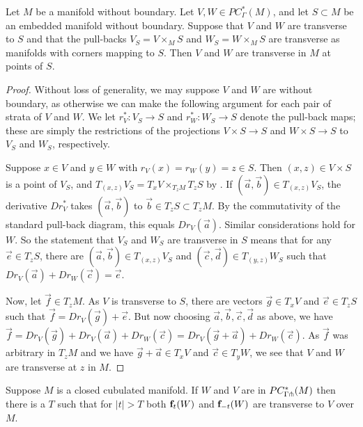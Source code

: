\begin{lemma}\label{L:local to global}
	Let $M$ be a manifold without boundary.
	Let $V, W \in PC^*_\Gamma(M)$, and let $S \subset M$ be an embedded manifold without boundary.
	Suppose that $V$ and $W$ are transverse to $S$ and that the pull-backs $V_S = V \times_M S$ and $W_S = W \times_M S$ are transverse as manifolds with corners mapping to $S$.
	Then $V$ and $W$ are transverse in $M$ at points of $S$.
\end{lemma}

\begin{proof}
	Without loss of generality, we may suppose $V$ and $W$ are without boundary, as otherwise we can make the following argument for each pair of strata of $V$ and $W$.
	We let $r_V^* \colon V_S \to S$ and $r_W^* \colon W_S \to S$ denote the pull-back maps; these are simply the restrictions of the projections $V \times S \to S$ and $W \times S \to S$ to $V_S$ and $W_S$, respectively.

	Suppose $x \in V$ and $y \in W$ with $r_V(x) = r_W(y) = z \in S$.
	Then $(x,z) \in V \times S$ is a point of $V_S$, and $T_{(x,z)}V_S = T_xV \times_{T_zM} T_zS$ by \cite[Lemma 2.28]{medina2022foundations}.
	If $(\vec a,\vec b) \in T_{(x,z)}V_S$, the derivative $Dr_V^*$ takes $(\vec a,\vec b)$ to $\vec b \in T_z S \subset T_zM$.
	By the commutativity of the standard pull-back diagram, this equals $Dr_V(\vec a)$.
	Similar considerations hold for $W$.
	So the statement that $V_S$ and $W_S$ are transverse in $S$ means that for any $\vec e \in T_z S$, there are $(\vec a,\vec b) \in T_{(x,z)}V_S$ and $(\vec c,\vec d) \in T_{(y,z)}W_S$ such that $Dr_V(\vec a) + Dr_W(\vec c) = \vec e$.

	Now, let $\vec f \in T_z M$.
	As $V$ is transverse to $S$, there are vectors $\vec g \in T_x V$ and $\vec e \in T_z S$ such that $\vec f = Dr_V(\vec g) + \vec e$.
	But now choosing $\vec a,\vec b,\vec c,\vec d$ as above, we have $\vec f = Dr_V(\vec g) + Dr_V(\vec a) + Dr_W(\vec c) = Dr_V(\vec g + \vec a) +Dr_W(\vec c)$.
	As $\vec f$ was arbitrary in $T_zM$ and we have $\vec g + \vec a \in T_x V$ and $\vec c \in T_y W$, we see that $V$ and $W$ are transverse at $z$ in $M$.
\end{proof}

\begin{corollary}
	Suppose $M$ is a closed cubulated manifold.
	If $W$ and $V$ are in $PC_{\Gamma \pitchfork}^*(M)$ then there is a $T$ such that for $|t|>T$ both $\mathbf{f}_t(W)$ and $\mathbf{f}_{-t}(W)$ are transverse to $V$ over $M$.
\end{corollary}

